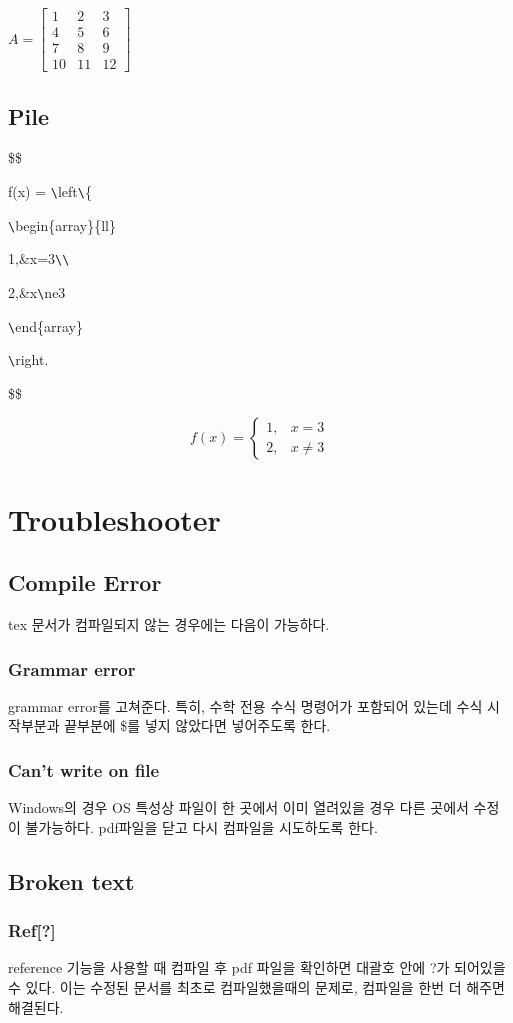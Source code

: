 \documentclass[11pt]{article}
\begin{document}
$A = \left[ \begin{array}{ccc}
1 & 2 & 3\\
4 & 5 & 6\\
7 & 8 & 9\\
10 & 11 & 12
\end{array}
\right]$

\longline
\subsection{Pile}
\$\$

f(x) = \verb+\+left\verb+\+\{

\verb+\+begin\{array\}\{ll\}

1,\&x=3\verb+\+\verb+\+

2,\&x\verb+\+ne3

\verb+\+end\{array\}

\verb+\+right.

\$\$

$$
f(x) = \left\{
\begin{array}{ll}
1,&x=3\\
2,&x\ne3
\end{array}
\right.
$$

\longline
\section{Troubleshooter}
\subsection{Compile Error}
tex 문서가 컴파일되지 않는 경우에는 다음이 가능하다.
\subsubsection{Grammar error}
grammar error를 고쳐준다.
특히, 수학 전용 수식 명령어가 포함되어 있는데 수식 시작부분과 끝부분에 \$를 넣지 않았다면 넣어주도록 한다. 
\subsubsection{Can't write on file}
Windows의 경우 OS 특성상 파일이 한 곳에서 이미 열려있을 경우 다른 곳에서 수정이 불가능하다.
pdf파일을 닫고 다시 컴파일을 시도하도록 한다.


\subsection{Broken text}
\subsubsection{Ref[?]}
reference 기능을 사용할 때 컴파일 후 pdf 파일을 확인하면 대괄호 안에 ?가 되어있을수 있다. 이는 수정된 문서를 최초로 컴파일했을때의 문제로, 컴파일을 한번 더 해주면 해결된다.
\end{document}
